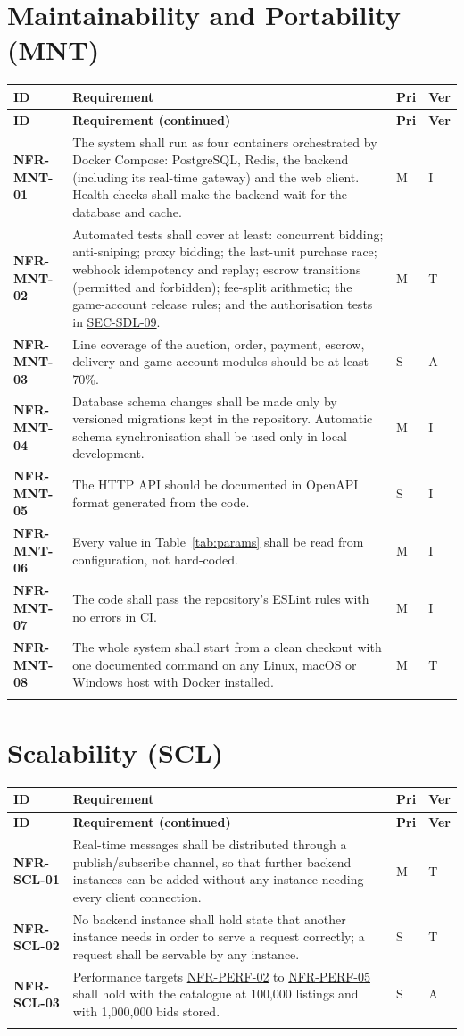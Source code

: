 \documentclass[11pt,a4paper]{report}
\makeatletter
\newenvironment{reqs}{%
  \small
  \begin{longtable}{@{}>{\raggedright\arraybackslash}p{2.35cm}
                       >{\raggedright\arraybackslash}p{10.3cm}
                       >{\centering\arraybackslash}p{0.7cm}
                       >{\centering\arraybackslash}p{0.7cm}@{}}
  \toprule
  \textbf{ID} & \textbf{Requirement} & \textbf{Pri} & \textbf{Ver} \\
  \midrule
  \endfirsthead
  \toprule
  \textbf{ID} & \textbf{Requirement (continued)} & \textbf{Pri} & \textbf{Ver} \\
  \midrule
  \endhead
  \bottomrule
  \endfoot
}{\end{longtable}}
\newcommand{\req}[5]{\leavevmode\textbf{#1}\hypertarget{#1}{} & #5 & #2 & #3 \\ \addlinespace[2pt]}
\newcommand{\rr}[1]{\hyperlink{#1}{#1}}
\makeatother
\begin{document}
\section{Maintainability and Portability (MNT)}
\begin{reqs}
\req{NFR-MNT-01}{M}{I}{NFR-14}{The system shall run as four containers orchestrated by Docker Compose: PostgreSQL, Redis, the backend (including its real-time gateway) and the web client. Health checks shall make the backend wait for the database and cache.}
\req{NFR-MNT-02}{M}{T}{NFR-15}{Automated tests shall cover at least: concurrent bidding; anti-sniping; proxy bidding; the last-unit purchase race; webhook idempotency and replay; escrow transitions (permitted and forbidden); fee-split arithmetic; the game-account release rules; and the authorisation tests in \rr{SEC-SDL-09}.}
\req{NFR-MNT-03}{S}{A}{new}{Line coverage of the auction, order, payment, escrow, delivery and game-account modules should be at least 70\%.}
\req{NFR-MNT-04}{M}{I}{new}{Database schema changes shall be made only by versioned migrations kept in the repository. Automatic schema synchronisation shall be used only in local development.}
\req{NFR-MNT-05}{S}{I}{new}{The HTTP API should be documented in OpenAPI format generated from the code.}
\req{NFR-MNT-06}{M}{I}{new}{Every value in Table~\ref{tab:params} shall be read from configuration, not hard-coded.}
\req{NFR-MNT-07}{M}{I}{new}{The code shall pass the repository's ESLint rules with no errors in CI.}
\req{NFR-MNT-08}{M}{T}{new}{The whole system shall start from a clean checkout with one documented command on any Linux, macOS or Windows host with Docker installed.}
\end{reqs}

\section{Scalability (SCL)}
\begin{reqs}
\req{NFR-SCL-01}{M}{T}{NFR-19}{Real-time messages shall be distributed through a publish/subscribe channel, so that further backend instances can be added without any instance needing every client connection.}
\req{NFR-SCL-02}{S}{T}{NFR-20}{No backend instance shall hold state that another instance needs in order to serve a request correctly; a request shall be servable by any instance.}
\req{NFR-SCL-03}{S}{A}{NFR-20}{Performance targets \rr{NFR-PERF-02} to \rr{NFR-PERF-05} shall hold with the catalogue at 100{,}000 listings and with 1{,}000{,}000 bids stored.}
\end{reqs}
\end{document}
